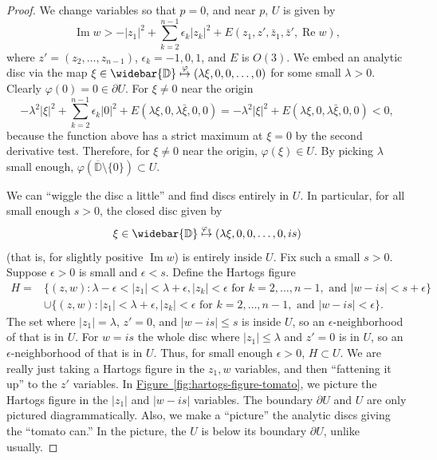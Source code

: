 \documentclass[12pt,openany]{book}
\renewcommand{\Re}{\operatorname{Re}}
\renewcommand{\Im}{\operatorname{Im}}
\newcommand{\sabs}[1]{\lvert {#1} \rvert}
\newcommand{\D}{{\mathbb{D}}}
\theoremstyle{plain}
\theoremstyle{remark}
\theoremstyle{definition}
\theoremstyle{exercise}
\theoremstyle{example}
\newcommand{\figureref}[1]{\hyperref[#1]{Figure~\ref*{#1}}}
\begin{document}
\begin{proof}
We change variables so that $p = 0$, and
near $p$, $U$ is given by
\begin{equation*}
\Im w > -\sabs{z_1}^2 + \sum_{k=2}^{n-1} \epsilon_k \sabs{z_k}^2 +
E(z_1,z',\bar{z}_1,\bar{z}',\Re w) ,
\end{equation*}
where $z' = (z_2,\ldots,z_{n-1})$, $\epsilon_k = -1,0,1$, and $E$ is $O(3)$.
We embed an analytic disc via the map
$\xi \in \widebar{\D} \overset{\varphi}{\mapsto} (\lambda \xi, 0, 0, \ldots, 0)$
for some small $\lambda > 0$.
Clearly $\varphi(0) = 0 \in \partial U$.  For $\xi \not= 0$ near the origin
\begin{equation*}
-\lambda^2 \sabs{\xi}^2 + \sum_{k=2}^{n-1} \epsilon_k \sabs{0}^2 + E(\lambda
\xi,0,\lambda \bar{\xi},0,0)
=
-\lambda^2 \sabs{\xi}^2 + E(\lambda
\xi,0,\lambda \bar{\xi},0,0)
< 0 ,
\end{equation*}
because
the function above has a strict maximum at $\xi = 0$
by the second derivative test.
Therefore, for $\xi \not= 0$ near the origin,
$\varphi(\xi) \in U$.  By picking $\lambda$ small enough,
$\varphi(\overline{\D}\setminus\{0\}) \subset U$.

We can ``wiggle the disc a little'' and
find discs entirely in $U$.  In particular, for all small enough $s > 0$,
the closed disc given by
\begin{equation*}
\xi \in \widebar{\D} \overset{\varphi_s}{\mapsto} (\lambda \xi, 0, 0, \ldots, 0, i s)
\end{equation*}
(that is, for slightly positive $\Im w$)
is entirely inside $U$.
Fix such a small $s > 0$.
Suppose $\epsilon > 0$ is small and $\epsilon < s$.
Define the Hartogs figure
\begin{equation*}
\begin{split}
H =
& \bigl\{ (z,w) : \lambda - \epsilon < \sabs{z_1} < \lambda + \epsilon,
\sabs{z_k} < \epsilon \text{ for } k=2,\ldots,n-1, \text{ and }
\sabs{w-is} < s+\epsilon \bigr\}
\\
&
\cup
\bigl\{ (z,w) : \sabs{z_1} < \lambda + \epsilon,
\sabs{z_k} < \epsilon \text{ for } k=2,\ldots,n-1, \text{ and }
\sabs{w-is} < \epsilon \bigr\} .
\end{split}
\end{equation*}
The set where $\sabs{z_1} = \lambda$, $z' = 0$,
and $\sabs{w-is} \leq s$ is inside $U$, so
an $\epsilon$-neighborhood of that is in $U$.
For
$w = is$ the whole disc where $\sabs{z_1} \leq \lambda$ and $z'=0$ is in $U$,
so an $\epsilon$-neighborhood of that is in $U$.
Thus, for small enough $\epsilon >0$, $H \subset U$.
We are really just taking a Hartogs figure in the $z_1,w$ variables, and then
``fattening it up'' to the $z'$ variables.
In \figureref{fig:hartogs-figure-tomato}, we picture the Hartogs figure in the $\sabs{z_1}$ and $\sabs{w-is}$
variables.  The boundary $\partial U$ and $U$ are only pictured diagrammatically.
Also, we make a ``picture'' the analytic discs giving the ``tomato can.''
In the picture, the $U$ is below its boundary $\partial U$, unlike usually.


\end{proof}
\end{document}

